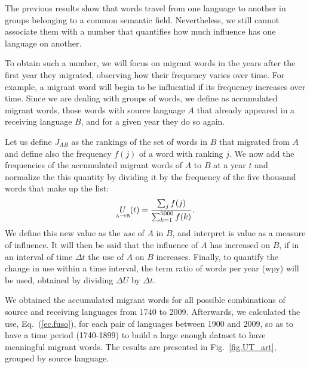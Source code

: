 \documentclass[10pt,letterpaper]{article} %
\newcommand{\eref}[1]{Eq.~(\ref{#1})}
\newcommand{\fref}[1]{Fig.~\ref{#1}}
\begin{document}
The previous results show that words travel from one language to another in
groups belonging to a common semantic field. Nevertheless, we still cannot
associate them with a number that quantifies how much influence has one
language on another.

To obtain such a number, we will focus on migrant words in the years after the
first year they migrated, observing how their frequency varies over time. For
example, a migrant word will begin to be influential if its frequency increases
over time. Since we are dealing with groups of words, we define as accumulated
migrant words, those words with source language $A$ that already appeared in a
receiving language $B$, and for a given year they do so again.

Let us define $J_{AB}$ as the rankings of the set of words in $B$ that migrated
from $A$ and define also the frequency $f(j)$ of a word with ranking $j$. We now
add the frequencies of the accumulated
migrant words of $A$ to $B$ at a year $t$ and normalize the this quantity by
dividing it by the frequency of the five thousand words that make up the list:
\begin{equation}
\label{ec.fuso}
\underset{ \text{\tiny A} \to  \text{\tiny B} }{U}(t) = \frac{\sum_{j}
f(j)}{\sum_{k=1}^{5000} f(k)}.
\end{equation}
We define this new value as the \textit{use} of $A$ in $B$, and interpret is value
as a measure of influence. It will then be said that the influence of $A$ has increased on
$B$, if in an interval of time $\Delta t$ the use of $A$ on $B$ increases.
Finally, to quantify the change in use within a time interval, the term ratio
of words per year (wpy) will be used, obtained by dividing $\Delta U$  by
$\Delta t$.

We obtained the accumulated migrant words for all possible combinations of
source and receiving languages from 1740 to 2009.  Afterwards, we calculated
the use, \eref{ec.fuso},  for each pair of languages between 1900 and 2009, so
as to have a time period (1740-1899) to build a large enough dataset to have
meaningful migrant words. The results are presented in \fref{fig.UT_art}, 
grouped by source language. 


% 
\end{document}
